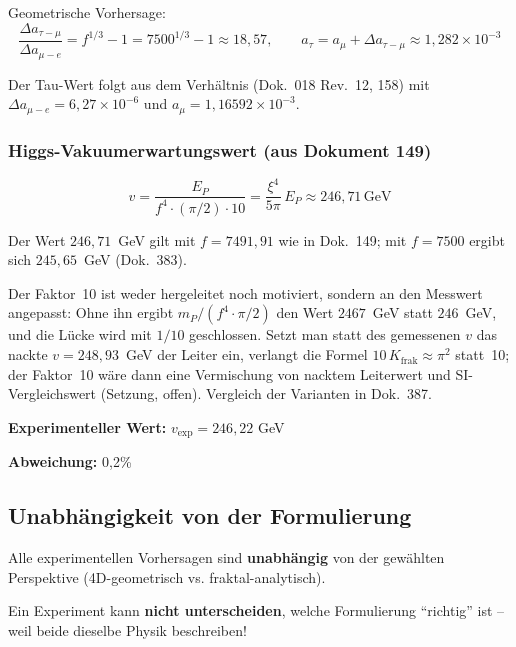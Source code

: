 	Geometrische Vorhersage:
	\begin{equation}
		\frac{\Delta a_{\tau-\mu}}{\Delta a_{\mu-e}} = f^{1/3} - 1 = 7500^{1/3} - 1 \approx 18{,}57, \qquad a_\tau = a_\mu + \Delta a_{\tau-\mu} \approx 1{,}282 \times 10^{-3}
	\end{equation}

	Der Tau-Wert folgt aus dem Verhältnis (Dok.~018 Rev.~12, 158) mit $\Delta a_{\mu-e} = 6{,}27\times10^{-6}$ und $a_\mu = 1{,}16592\times10^{-3}$.
	
	\subsubsection{Higgs-Vakuumerwartungswert (aus Dokument 149)}
	
	\begin{equation}
		v = \frac{E_P}{f^4 \cdot (\pi/2) \cdot 10} = \frac{\xi^4}{5\pi}\,E_P \approx 246{,}71\,\text{GeV}
	\end{equation}

	Der Wert $246{,}71$~GeV gilt mit $f = 7491{,}91$ wie in Dok.~149; mit $f = 7500$ ergibt sich $245{,}65$~GeV (Dok.~383).

	Der Faktor~10 ist weder hergeleitet noch motiviert, sondern an den Messwert angepasst: Ohne ihn ergibt $m_P/(f^4\cdot\pi/2)$ den Wert $2467$~GeV statt $246$~GeV, und die Lücke wird mit $1/10$ geschlossen. Setzt man statt des gemessenen $v$ das nackte $v=248{,}93$~GeV der Leiter ein, verlangt die Formel $10\,K_{\text{frak}}\approx\pi^2$ statt~10; der Faktor~10 wäre dann eine Vermischung von nacktem Leiterwert und SI-Vergleichswert (Setzung, offen). Vergleich der Varianten in Dok.~387.
	
	\textbf{Experimenteller Wert:} $v_{\exp} = 246{,}22$ GeV
	
	\textbf{Abweichung:} 0{,}2\%
	
	\subsection{Unabhängigkeit von der Formulierung}
	
	\begin{important}
		Alle experimentellen Vorhersagen sind \textbf{unabhängig} von der gewählten Perspektive (4D-geometrisch vs. fraktal-analytisch).
		
		Ein Experiment kann \textbf{nicht unterscheiden}, welche Formulierung \enquote{richtig} ist -- weil beide dieselbe Physik beschreiben!
	\end{important}
	
